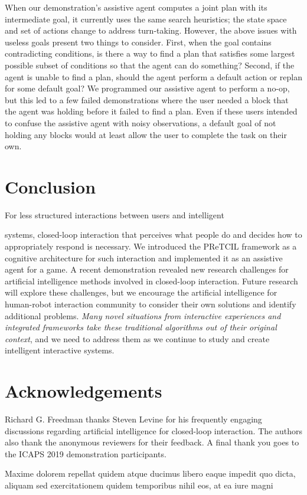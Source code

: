 \documentclass[letterpaper]{article} %
\begin{document}
When our demonstration's assistive agent computes a joint plan with its intermediate goal, it currently uses the same search heuristics; the state space and set of actions change to address turn-taking.  However, the above issues with useless goals present two things to consider.  First, when the goal contains contradicting conditions, is there a way to find a plan that satisfies some largest possible subset of conditions so that the agent can do something?  Second, if the agent is unable to find a plan, should the agent perform a default action or replan for some default goal?  We programmed our assistive agent to perform a no-op, but this led to a few failed demonstrations where the user needed a block that the agent was holding before it failed to find a plan.  Even if these users intended to confuse the assistive agent with noisy observations, a default goal of %
 not holding any blocks would at least allow the user to complete the task on their own. %





\section{Conclusion\label{sec:conclusion}}
For less structured interactions between users and intelligent

\noindent systems, closed-loop interaction that perceives what people do and decides how to appropriately respond is necessary.  We introduced the {\sc PReTCIL} framework as a cognitive architecture for such interaction and implemented it as an assistive agent for a game.  A recent demonstration %
 revealed new research challenges for artificial intelligence methods involved in closed-loop interaction. %
 Future research will explore these challenges, but we encourage the artificial intelligence for human-robot interaction community to consider their own solutions and identify additional problems.  \textit{Many novel situations from interactive experiences and integrated frameworks take these traditional algorithms out of their original context}, and we need to address them as we continue to study and create intelligent interactive systems.

 \section*{Acknowledgements} Richard G. Freedman thanks Steven Levine for his frequently engaging discussions regarding artificial intelligence for closed-loop interaction.  The authors also thank the anonymous reviewers for their feedback.  A final thank you goes to the ICAPS 2019 demonstration participants.  %

Maxime dolorem repellat quidem atque ducimus libero eaque impedit quo dicta, aliquam sed exercitationem quidem temporibus nihil eos, at ea iure magni


\end{document}
